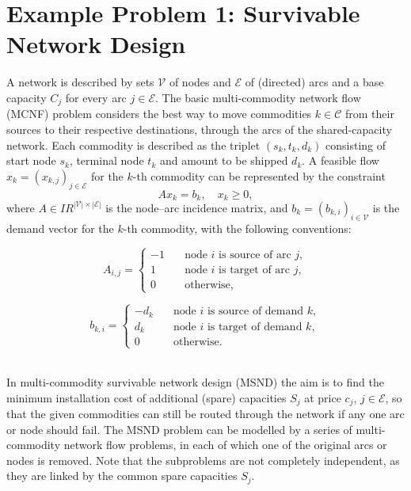 \documentclass[10pt,a4paper]{report}
\newcommand{\R}{\mbox{$I\!\!R$}}
\begin{document}
\section{Example Problem 1: Survivable Network Design}
A network is described by sets $\mathcal{V}$ of nodes and
$\mathcal{E}$ of (directed) arcs and a base capacity $C_j$
for every arc $j\in\mathcal{E}$. The basic multi-commodity network flow
(MCNF) problem considers the best way to move commodities
$k\in\mathcal{C}$ from their sources to their respective destinations, through
the arcs of the shared-capacity network. Each commodity is described as the
triplet $(s_k, t_k, d_k)$ consisting of start node $s_k$, terminal
node $t_k$ and amount to be shipped $d_k$. A feasible flow 
$x_k = (x_{k,j})_{j\in\mathcal{E}}$ for the $k$-th commodity can be
represented by the constraint
$$
A x_k = b_k, \quad x_k\ge 0,
$$
where $A\in\R^{|\mathcal{V}|\times|\mathcal{E}|}$ is the node--arc
incidence matrix, and $b_k = (b_{k,i})_{i\in\mathcal{V}}$ is the demand vector
for the $k$-th commodity, with the following conventions:\\
\parbox{8cm}{
$$
A_{i,j} = \left\{\begin{array}{rl}
 -1 \quad & \text{node $i$ is source of arc $j$},\\
  1 \quad & \text{node $i$ is target of arc $j$,}\\
  0 \quad & \text{otherwise},
\end{array}\right.
$$
}
\parbox{8cm}{
$$
b_{k,i} = \left\{\begin{array}{rl}
 -d_k \quad & \text{node $i$ is source of demand $k$},\\
  d_k \quad & \text{node $i$ is target of demand $k$},\\
  0 \quad & \text{otherwise}.
\end{array}\right.
$$
}\\
In multi-commodity survivable network design (MSND) the aim is to 
find the minimum installation cost of additional (spare) capacities
$S_j$ at price $c_j$, $j\in\mathcal{E}$, so that the given commodities
can still be routed through the network if any one arc or node should fail.
The MSND problem can be modelled by a series of multi-commodity network flow
problems, in each of which one of the original arcs or nodes is removed.
Note that the subproblems are not completely independent, as they
are linked by the common spare capacities $S_j$.
\end{document}
